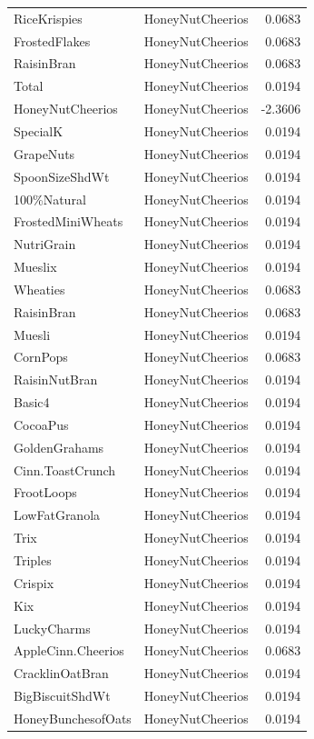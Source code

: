 \begin{longtable}{llr}
RiceKrispies & HoneyNutCheerios & 0.0683 \\
FrostedFlakes & HoneyNutCheerios & 0.0683 \\
RaisinBran & HoneyNutCheerios & 0.0683 \\
Total & HoneyNutCheerios & 0.0194 \\
HoneyNutCheerios & HoneyNutCheerios & -2.3606 \\
SpecialK & HoneyNutCheerios & 0.0194 \\
GrapeNuts & HoneyNutCheerios & 0.0194 \\
SpoonSizeShdWt & HoneyNutCheerios & 0.0194 \\
100\%Natural & HoneyNutCheerios & 0.0194 \\
FrostedMiniWheats & HoneyNutCheerios & 0.0194 \\
NutriGrain & HoneyNutCheerios & 0.0194 \\
Mueslix & HoneyNutCheerios & 0.0194 \\
Wheaties & HoneyNutCheerios & 0.0683 \\
RaisinBran & HoneyNutCheerios & 0.0683 \\
Muesli & HoneyNutCheerios & 0.0194 \\
CornPops & HoneyNutCheerios & 0.0683 \\
RaisinNutBran & HoneyNutCheerios & 0.0194 \\
Basic4 & HoneyNutCheerios & 0.0194 \\
CocoaPus & HoneyNutCheerios & 0.0194 \\
GoldenGrahams & HoneyNutCheerios & 0.0194 \\
Cinn.ToastCrunch & HoneyNutCheerios & 0.0194 \\
FrootLoops & HoneyNutCheerios & 0.0194 \\
LowFatGranola & HoneyNutCheerios & 0.0194 \\
Trix & HoneyNutCheerios & 0.0194 \\
Triples & HoneyNutCheerios & 0.0194 \\
Crispix & HoneyNutCheerios & 0.0194 \\
Kix & HoneyNutCheerios & 0.0194 \\
LuckyCharms & HoneyNutCheerios & 0.0194 \\
AppleCinn.Cheerios & HoneyNutCheerios & 0.0683 \\
CracklinOatBran & HoneyNutCheerios & 0.0194 \\
BigBiscuitShdWt & HoneyNutCheerios & 0.0194 \\
HoneyBunchesofOats & HoneyNutCheerios & 0.0194 \\

\end{longtable}
